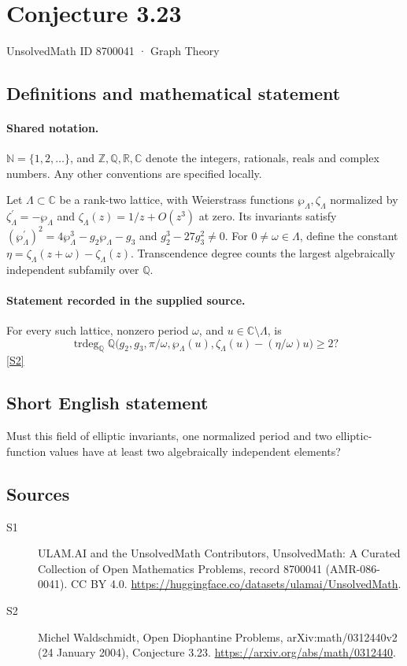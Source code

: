 \documentclass[11pt]{article}
\newcommand{\sref}[2]{\hyperlink{source:#1:#2}{[S#2]}}
\begin{document}
\setcounter{section}{8700040}
\section{Conjecture 3.23}\label{8700041}
{\small\sffamily UnsolvedMath ID 8700041 · Graph Theory}
\subsection{Definitions and mathematical statement}

\paragraph{Shared notation.}$\mathbb N=\{1,2,\ldots\}$, and $\mathbb Z,\mathbb Q,\mathbb R,\mathbb C$ denote the integers, rationals, reals and complex numbers. Any other conventions are specified locally.


Let $\Lambda\subset\mathbb C$ be a rank-two lattice, with Weierstrass functions $\wp_\Lambda,\zeta_\Lambda$ normalized by $\zeta_\Lambda^{\prime}=-\wp_\Lambda$ and $\zeta_\Lambda(z)=1/z+O(z^3)$ at zero. Its invariants satisfy $(\wp_\Lambda^{\prime})^2=4\wp_\Lambda^3-g_2\wp_\Lambda-g_3$ and $g_2^3-27g_3^2\ne0$. For $0\ne\omega\in\Lambda$, define the constant $\eta=\zeta_\Lambda(z+\omega)-\zeta_\Lambda(z)$. Transcendence degree counts the largest algebraically independent subfamily over $\mathbb Q$.
\paragraph{Statement recorded in the supplied source.}
For every such lattice, nonzero period $\omega$, and $u\in\mathbb C\setminus\Lambda$, is \[\operatorname{trdeg}_{\mathbb Q}\mathbb Q\bigl(g_2,g_3,\pi/\omega,\wp_\Lambda(u),\zeta_\Lambda(u)-(\eta/\omega)u\bigr)\ge2?\] \sref{8700041}{2}
\subsection{Short English statement}
Must this field of elliptic invariants, one normalized period and two elliptic-function values have at least two algebraically independent elements?
\subsection{Sources}
\begin{description}
\item[\hypertarget{source:8700041:1}{S1}] ULAM.AI and the UnsolvedMath Contributors, UnsolvedMath: A Curated Collection of Open Mathematics Problems, record 8700041 (AMR-086-0041). CC BY 4.0. \url{https://huggingface.co/datasets/ulamai/UnsolvedMath}.
\item[\hypertarget{source:8700041:2}{S2}] Michel Waldschmidt, Open Diophantine Problems, arXiv:math/0312440v2 (24 January 2004), Conjecture 3.23. \url{https://arxiv.org/abs/math/0312440}.
\end{description}
\label{end:8700041}
\end{document}
